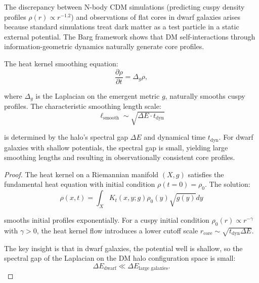 \begin{theorem}
\label{thm:coreCuspResolution}

The discrepancy between N-body CDM simulations (predicting cuspy density profiles $\rho(r) \propto r^{-1.2}$) and observations of flat cores in dwarf galaxies arises because standard simulations treat dark matter as a test particle in a static external potential. The Barg framework shows that DM self-interactions through information-geometric dynamics naturally generate core profiles.

The heat kernel smoothing equation:
\begin{equation}
\frac{\partial \rho}{\partial t} = \Delta_g \rho,
\end{equation}

where $\Delta_g$ is the Laplacian on the emergent metric $g$, naturally smooths cuspy profiles. The characteristic smoothing length scale:
\begin{equation}
\ell_{\text{smooth}} \sim \sqrt{\Delta E \cdot t_{\text{dyn}}}
\end{equation}

is determined by the halo's spectral gap $\Delta E$ and dynamical time $t_{\text{dyn}}$. For dwarf galaxies with shallow potentials, the spectral gap is small, yielding large smoothing lengths and resulting in observationally consistent core profiles.

\begin{proof}

The heat kernel on a Riemannian manifold $(X, g)$ satisfies the fundamental heat equation with initial condition $\rho(t=0) = \rho_0$. The solution:
\begin{equation}
\rho(x, t) = \int_X K_t(x, y; g) \rho_0(y) \sqrt{g(y)} dy
\end{equation}

smooths initial profiles exponentially. For a cuspy initial condition $\rho_0(r) \propto r^{-\gamma}$ with $\gamma > 0$, the heat kernel flow introduces a lower cutoff scale $r_{\text{core}} \sim \sqrt{t_{\text{dyn}} \Delta E}$.

The key insight is that in dwarf galaxies, the potential well is shallow, so the spectral gap of the Laplacian on the DM halo configuration space is small:
\begin{equation}
\Delta E_{\text{dwarf}} \ll \Delta E_{\text{large galaxies}}.
\end{equation}


\end{proof}
\end{theorem}
